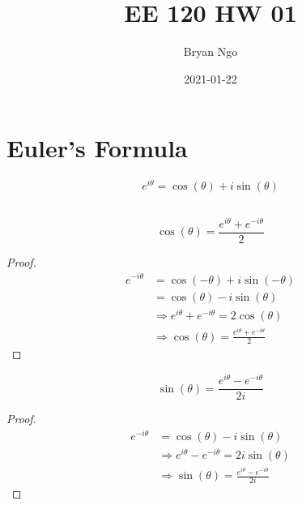 \documentclass{article}
\title{EE 120 HW 01}
\author{Bryan Ngo}
\date{2021-01-22}
\begin{document}
\maketitle

\section{Euler's Formula}

\begin{equation}
    e^{i \theta} = \cos(\theta) + i \sin(\theta)
\end{equation}

\subsection{}

\begin{theorem}
    \begin{equation}
        \cos(\theta) = \frac{e^{i \theta} + e^{-i \theta}}{2}
    \end{equation}
\end{theorem}
\begin{proof}
    \begin{align}
        e^{-i \theta} &= \cos(-\theta) + i \sin(-\theta) \\
        &= \cos(\theta) - i \sin(\theta) \\
        &\Rightarrow e^{i \theta} + e^{-i \theta} = 2 \cos(\theta) \\
        &\Rightarrow \cos(\theta) = \frac{e^{i \theta} + e^{-i \theta}}{2}
    \end{align}
\end{proof}
\begin{theorem}
    \begin{equation}
        \sin(\theta) = \frac{e^{i \theta} - e^{-i \theta}}{2i}
    \end{equation}
\end{theorem}
\begin{proof}
    \begin{align}
        e^{-i \theta} &= \cos(\theta) - i \sin(\theta) \\
        &\Rightarrow e^{i \theta} - e^{-i \theta} = 2i \sin(\theta) \\
        &\Rightarrow \sin(\theta) = \frac{e^{i \theta} - e^{-i \theta}}{2i}
    \end{align}
\end{proof}

\subsection{}
\end{document}
